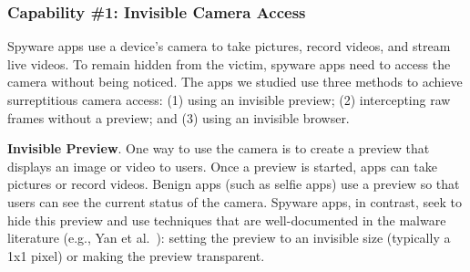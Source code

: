 \documentclass[sigconf,balance=false]{acmart}
\begin{document}
\subsubsection*{Capability \#1: Invisible Camera Access}
\label{subsubsec:invisible_cam}
Spyware apps use a device's camera to take pictures, record videos, and stream live
videos. To remain hidden from the victim, spyware apps need to access the camera
without being noticed. The apps we studied use three methods to achieve
surreptitious camera access: (1) using an invisible preview; (2) intercepting raw
frames without a preview; and (3) using an invisible browser.




\textbf{Invisible Preview}. One way to use the camera is to create a preview that displays an image or video to users. Once a preview is started, apps can take pictures or record videos. Benign apps (such as selfie apps) use a preview so that users can see the current status of the camera. Spyware apps, in contrast, seek to hide this preview and use techniques that are well-documented in the malware literature (e.g., Yan et al.~\cite{yan2019understanding}): setting the preview to an invisible size (typically a 1x1 pixel) or making the preview transparent.
\end{document}
